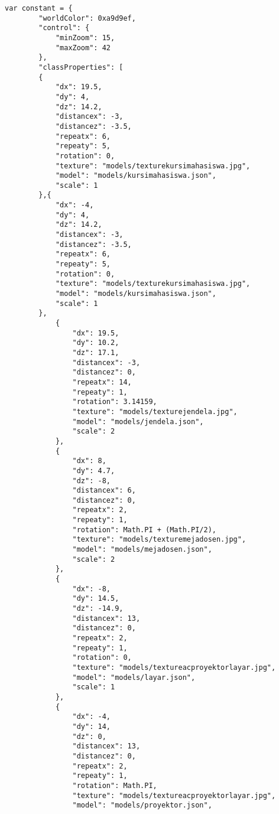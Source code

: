 \begin{lstlisting}[caption={Contoh JSON untuk ruangan kelas pada saat ujian.}, label={lst:json},captionpos=b]
var constant = {
        "worldColor": 0xa9d9ef,
        "control": {
            "minZoom": 15,
            "maxZoom": 42
        },
        "classProperties": [
        {
            "dx": 19.5,
            "dy": 4,
            "dz": 14.2,
            "distancex": -3,
            "distancez": -3.5,
            "repeatx": 6,
            "repeaty": 5,
            "rotation": 0,
            "texture": "models/texturekursimahasiswa.jpg",
            "model": "models/kursimahasiswa.json",
            "scale": 1
        },{
            "dx": -4,
            "dy": 4,
            "dz": 14.2,
            "distancex": -3,
            "distancez": -3.5,
            "repeatx": 6,
            "repeaty": 5,
            "rotation": 0,
            "texture": "models/texturekursimahasiswa.jpg",
            "model": "models/kursimahasiswa.json",
            "scale": 1
        },
            {
                "dx": 19.5,
                "dy": 10.2,
                "dz": 17.1,
                "distancex": -3,
                "distancez": 0,
                "repeatx": 14,
                "repeaty": 1,
                "rotation": 3.14159,
                "texture": "models/texturejendela.jpg",
                "model": "models/jendela.json",
                "scale": 2
            },
            {
                "dx": 8,
                "dy": 4.7,
                "dz": -8,
                "distancex": 6,
                "distancez": 0,
                "repeatx": 2,
                "repeaty": 1,
                "rotation": Math.PI + (Math.PI/2),
                "texture": "models/texturemejadosen.jpg",
                "model": "models/mejadosen.json",
                "scale": 2
            },
            {
                "dx": -8,
                "dy": 14.5,
                "dz": -14.9,
                "distancex": 13,
                "distancez": 0,
                "repeatx": 2,
                "repeaty": 1,
                "rotation": 0,
                "texture": "models/textureacproyektorlayar.jpg",
                "model": "models/layar.json",
                "scale": 1
            },
            {
                "dx": -4,
                "dy": 14,
                "dz": 0,
                "distancex": 13,
                "distancez": 0,
                "repeatx": 2,
                "repeaty": 1,
                "rotation": Math.PI,
                "texture": "models/textureacproyektorlayar.jpg",
                "model": "models/proyektor.json",

\end{lstlisting}
